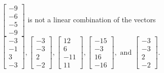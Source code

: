 \begin{exercise}
\begin{exerciseStatement}
  \end{exerciseStatement}
  \begin{exerciseAnswer}
   \(\left[\begin{array}{c}
-9 \\
-6 \\
-5 \\
-9
\end{array}\right]\) 
  	 is not  
	a linear combination of the vectors \(\left[\begin{array}{c}
-3 \\
-1 \\
3 \\
-3
\end{array}\right] , \left[\begin{array}{c}
-3 \\
-3 \\
2 \\
-2
\end{array}\right] , \left[\begin{array}{c}
12 \\
6 \\
-11 \\
11
\end{array}\right] , \left[\begin{array}{c}
-15 \\
-3 \\
16 \\
-16
\end{array}\right] , \text{ and } \left[\begin{array}{c}
-3 \\
-3 \\
2 \\
-2
\end{array}\right]\).

	
  


  \end{exerciseAnswer}
\end{exercise}